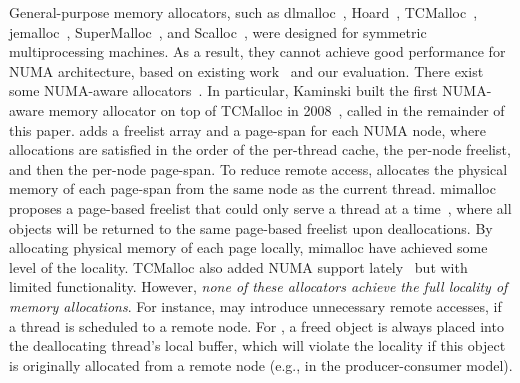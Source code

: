 General-purpose memory allocators, such as dlmalloc~\cite{dlmalloc},  Hoard~\cite{Hoard}, TCMalloc~\cite{tcmalloc}, jemalloc~\cite{jemalloc}, SuperMalloc~\cite{supermalloc}, and  Scalloc~\cite{Scalloc}, were designed for symmetric multiprocessing machines. As a result, they cannot achieve good performance for NUMA architecture, based on existing work~\cite{tcmallocnew, yang2019jarena} and our evaluation. There exist some NUMA-aware allocators~\cite{tcmallocnew, tcmalloc2, kim2013node, yang2019jarena, mimalloc}. In particular, Kaminski built the first NUMA-aware memory allocator on top of TCMalloc in 2008~\cite{tcmallocnew}, called \TN{} in the remainder of this paper. \TN{} adds a freelist array and a page-span for each NUMA node, where allocations are satisfied in the order of the per-thread cache, the per-node freelist, and then the per-node page-span. To reduce remote access, \TN{} allocates the physical memory of each page-span from the same node as the current thread. mimalloc proposes a page-based freelist that could only serve a thread at a time~\cite{mimalloc}, where all objects will be returned to the same page-based freelist upon deallocations. By allocating physical memory of each page locally, mimalloc have achieved some level of the locality. TCMalloc also added NUMA support lately~\cite{tcmalloc2} but with limited functionality. However, \textit{none of these allocators achieve the full locality of memory allocations}. For instance, \TN{} may introduce unnecessary remote accesses, if a thread is scheduled to a remote node. For \TN{}, a freed object is always placed into the deallocating thread's local buffer, which will violate the locality if this object is originally allocated from a remote node  (e.g., in the producer-consumer model). 


